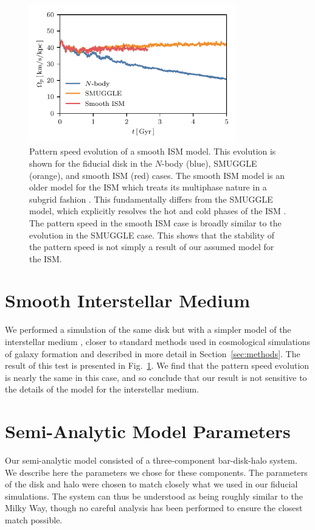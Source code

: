 \documentclass[twocolumn,linenumbers,trackchanges]{aastex631}
\newcommand{\Nbody}{$N$-body}
\newcommand{\SMUGGLE}{SMUGGLE}
\begin{document}
\begin{figure}
    \centering
    \includegraphics[width=9cm]{fig/ps_GFM.pdf}
    \caption{Pattern speed evolution of a smooth ISM model. This evolution is
    shown for the fiducial disk in the \Nbody{} (blue), \SMUGGLE{} (orange), and
    smooth ISM (red) cases. The smooth ISM model is an older model for the ISM
    which treats its multiphase nature in a subgrid fashion
    \citep{2003MNRAS.339..289S}. This fundamentally differs from the \SMUGGLE{}
    model, which explicitly resolves the hot and cold phases of the ISM
    \citep{2019MNRAS.489.4233M}. The pattern speed in the smooth ISM case is
    broadly similar to the evolution in the \SMUGGLE{} case. This shows that the
    stability of the pattern speed is not simply a result of our assumed model
    for the ISM.}
\label{fig:GFM}
\end{figure}

\section{Smooth Interstellar Medium}
We performed a simulation of the same disk but with a simpler model of the
interstellar medium \citep{2003MNRAS.339..289S}, closer to standard methods used
in cosmological simulations of galaxy formation and described in more detail in
Section~\ref{sec:methods}. The result of this test is presented in
Fig.~\ref{fig:GFM}. We find that the pattern speed evolution is nearly the same
in this case, and so conclude that our result is not sensitive to the details of
the model for the interstellar medium.

\section{Semi-Analytic Model Parameters}
\label{app:sam}
Our semi-analytic model consisted of a three-component bar-disk-halo system. We
describe here the parameters we chose for these components. The parameters of
the disk and halo were chosen to match closely what we used in our fiducial
simulations. The system can thus be understood as being roughly similar to the
Milky Way, though no careful analysis has been performed to ensure the closest
match possible.
\end{document}
